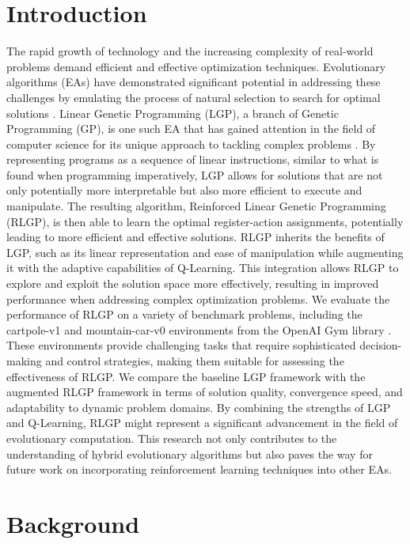 \documentclass[12pt, final]{dalcsthesis}
\begin{document}
\chapter{Introduction}
The rapid growth of technology and the increasing complexity of real-world problems demand efficient and effective optimization techniques. Evolutionary algorithms (EAs) have demonstrated significant potential in addressing these challenges by emulating the process of natural selection to search for optimal solutions \cite{poli08}. Linear Genetic Programming (LGP), a branch of Genetic Programming (GP), is one such EA that has gained attention in the field of computer science for its unique approach to tackling complex problems \cite{song03}. By representing programs as a sequence of linear instructions, similar to what is found when programming imperatively, LGP allows for solutions that are not only potentially more interpretable but also more efficient to execute and manipulate.
The resulting algorithm, Reinforced Linear Genetic Programming (RLGP), is then able to learn the optimal register-action assignments, potentially leading to more efficient and effective solutions. RLGP inherits the benefits of LGP, such as its linear representation and ease of manipulation while augmenting it with the adaptive capabilities of Q-Learning. This integration allows RLGP to explore and exploit the solution space more effectively, resulting in improved performance when addressing complex optimization problems.
We evaluate the performance of RLGP on a variety of benchmark problems, including the cartpole-v1 and mountain-car-v0 environments from the OpenAI Gym library \cite{1606.01540}. These environments provide challenging tasks that require sophisticated decision-making and control strategies, making them suitable for assessing the effectiveness of RLGP. We compare the baseline LGP framework with the augmented RLGP framework in terms of solution quality, convergence speed, and adaptability to dynamic problem domains.
By combining the strengths of LGP and Q-Learning, RLGP might represent a significant advancement in the field of evolutionary computation. This research not only contributes to the understanding of hybrid evolutionary algorithms but also paves the way for future work on incorporating reinforcement learning techniques into other EAs.

\chapter{Background}
\end{document}
